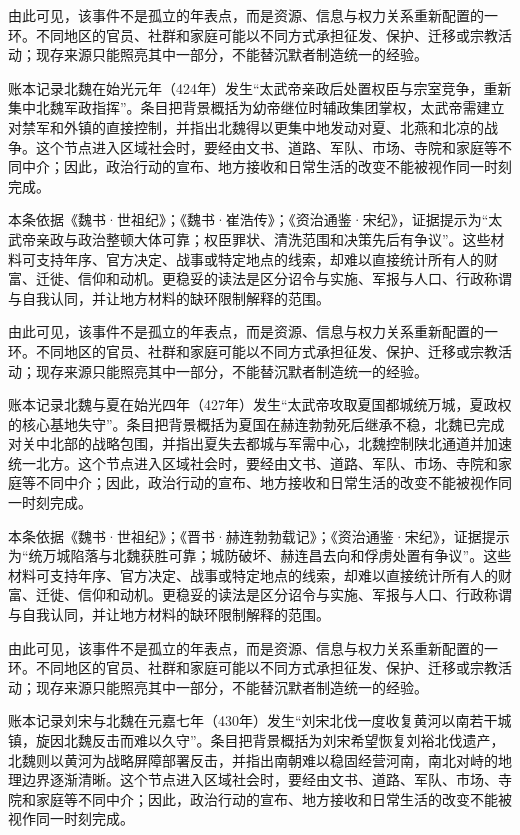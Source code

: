 由此可见，该事件不是孤立的年表点，而是资源、信息与权力关系重新配置的一环。不同地区的官员、社群和家庭可能以不同方式承担征发、保护、迁移或宗教活动；现存来源只能照亮其中一部分，不能替沉默者制造统一的经验。

账本记录北魏在始光元年（424年）发生“太武帝亲政后处置权臣与宗室竞争，重新集中北魏军政指挥”。条目把背景概括为幼帝继位时辅政集团掌权，太武帝需建立对禁军和外镇的直接控制，并指出北魏得以更集中地发动对夏、北燕和北凉的战争。这个节点进入区域社会时，要经由文书、道路、军队、市场、寺院和家庭等不同中介；因此，政治行动的宣布、地方接收和日常生活的改变不能被视作同一时刻完成。

本条依据《魏书·世祖纪》；《魏书·崔浩传》；《资治通鉴·宋纪》，证据提示为“太武帝亲政与政治整顿大体可靠；权臣罪状、清洗范围和决策先后有争议”。这些材料可支持年序、官方决定、战事或特定地点的线索，却难以直接统计所有人的财富、迁徙、信仰和动机。更稳妥的读法是区分诏令与实施、军报与人口、行政称谓与自我认同，并让地方材料的缺环限制解释的范围。

由此可见，该事件不是孤立的年表点，而是资源、信息与权力关系重新配置的一环。不同地区的官员、社群和家庭可能以不同方式承担征发、保护、迁移或宗教活动；现存来源只能照亮其中一部分，不能替沉默者制造统一的经验。

账本记录北魏与夏在始光四年（427年）发生“太武帝攻取夏国都城统万城，夏政权的核心基地失守”。条目把背景概括为夏国在赫连勃勃死后继承不稳，北魏已完成对关中北部的战略包围，并指出夏失去都城与军需中心，北魏控制陕北通道并加速统一北方。这个节点进入区域社会时，要经由文书、道路、军队、市场、寺院和家庭等不同中介；因此，政治行动的宣布、地方接收和日常生活的改变不能被视作同一时刻完成。

本条依据《魏书·世祖纪》；《晋书·赫连勃勃载记》；《资治通鉴·宋纪》，证据提示为“统万城陷落与北魏获胜可靠；城防破坏、赫连昌去向和俘虏处置有争议”。这些材料可支持年序、官方决定、战事或特定地点的线索，却难以直接统计所有人的财富、迁徙、信仰和动机。更稳妥的读法是区分诏令与实施、军报与人口、行政称谓与自我认同，并让地方材料的缺环限制解释的范围。

由此可见，该事件不是孤立的年表点，而是资源、信息与权力关系重新配置的一环。不同地区的官员、社群和家庭可能以不同方式承担征发、保护、迁移或宗教活动；现存来源只能照亮其中一部分，不能替沉默者制造统一的经验。

账本记录刘宋与北魏在元嘉七年（430年）发生“刘宋北伐一度收复黄河以南若干城镇，旋因北魏反击而难以久守”。条目把背景概括为刘宋希望恢复刘裕北伐遗产，北魏则以黄河为战略屏障部署反击，并指出南朝难以稳固经营河南，南北对峙的地理边界逐渐清晰。这个节点进入区域社会时，要经由文书、道路、军队、市场、寺院和家庭等不同中介；因此，政治行动的宣布、地方接收和日常生活的改变不能被视作同一时刻完成。

